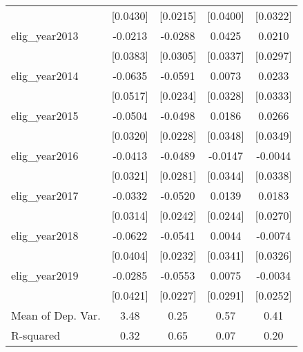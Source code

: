 \begin{table}[htbp]
\begin{tabular}{l*{4}{c}}
                    &    [0.0430]         &    [0.0215]         &    [0.0400]         &    [0.0322]         \\
\addlinespace
elig\_year2013       &     -0.0213         &     -0.0288         &      0.0425         &      0.0210         \\
                    &    [0.0383]         &    [0.0305]         &    [0.0337]         &    [0.0297]         \\
\addlinespace
elig\_year2014       &     -0.0635         &     -0.0591\sym{**} &      0.0073         &      0.0233         \\
                    &    [0.0517]         &    [0.0234]         &    [0.0328]         &    [0.0333]         \\
\addlinespace
elig\_year2015       &     -0.0504         &     -0.0498\sym{**} &      0.0186         &      0.0266         \\
                    &    [0.0320]         &    [0.0228]         &    [0.0348]         &    [0.0349]         \\
\addlinespace
elig\_year2016       &     -0.0413         &     -0.0489\sym{*}  &     -0.0147         &     -0.0044         \\
                    &    [0.0321]         &    [0.0281]         &    [0.0344]         &    [0.0338]         \\
\addlinespace
elig\_year2017       &     -0.0332         &     -0.0520\sym{**} &      0.0139         &      0.0183         \\
                    &    [0.0314]         &    [0.0242]         &    [0.0244]         &    [0.0270]         \\
\addlinespace
elig\_year2018       &     -0.0622         &     -0.0541\sym{**} &      0.0044         &     -0.0074         \\
                    &    [0.0404]         &    [0.0232]         &    [0.0341]         &    [0.0326]         \\
\addlinespace
elig\_year2019       &     -0.0285         &     -0.0553\sym{**} &      0.0075         &     -0.0034         \\
                    &    [0.0421]         &    [0.0227]         &    [0.0291]         &    [0.0252]         \\
\midrule
Mean of Dep. Var.   &        3.48         &        0.25         &        0.57         &        0.41         \\
R-squared           &        0.32         &        0.65         &        0.07         &        0.20         \\

\end{tabular}
\end{table}
